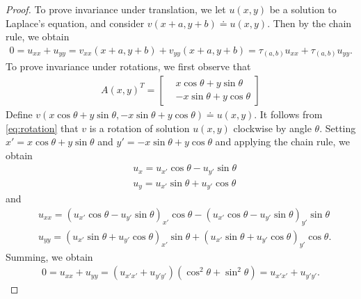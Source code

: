 \begin{proof}
	To prove invariance under translation, we let $u(x,y)$ be a solution to
	Laplace's equation, and consider $v(x+a, y+b) \doteq u(x,y)$. Then by the
	chain rule, we obtain
	\begin{equation*}
	\begin{split}
		0 = u_{xx} + u_{yy} = v_{xx}(x + a, y+b) + v_{yy}(x + a, y+b)
		= \tau_{(a,b)}u_{xx} + \tau_{(a,b)}u_{yy}.
	\end{split}
	\end{equation*}
	To prove invariance under rotations, we first observe that
	\begin{equation}
		\label{eq:rotation}
	\begin{split}
		A(x,y)^{T} = \begin{bmatrix}
		& x \cos \theta + y \sin \theta
		\\
		& -x \sin \theta + y \cos \theta
		\end{bmatrix}
	\end{split}
	\end{equation}
	Define $v(x \cos \theta + y \sin \theta, -x \sin \theta + y \cos \theta)
	\doteq u(x,y)$. It follows from \eqref{eq:rotation} that $v$ is a rotation of
	solution $u(x,y)$ clockwise by angle $\theta$. Setting
	$x' = x \cos \theta + y\sin \theta$ and $y' = -x \sin \theta + y \cos \theta$
	and applying the chain rule, we obtain
	\begin{equation*}
	\begin{split}
		& u_{x} = u_{x'} \cos \theta - u_{y'} \sin \theta
		\\
		& u_{y} = u_{x'} \sin \theta + u_{y'} \cos \theta
	\end{split}
	\end{equation*}
and
\begin{equation*}
\begin{split}
	& u_{xx} = (u_{x'} \cos \theta - u_{y'} \sin \theta)_{x'} \cos \theta -
	(u_{x'} \cos \theta - u_{y'} \sin \theta)_{y'} \sin \theta
	\\
	& u_{yy} = (u_{x'} \sin \theta + u_{y'} \cos \theta)_{x'} \sin \theta
	+ (u_{x'} \sin \theta + u_{y'} \cos \theta)_{y'} \cos \theta.
\end{split}
\end{equation*}
Summing, we obtain
\begin{equation*}
\begin{split}
	0 = u_{xx} + u_{yy} = \left( u_{x'x'} + u_{y'y'} \right)\left( \cos^{2} \theta
		+ \sin^{2} \theta
	\right) = u_{x'x'} + u_{y'y'}.
\end{split}
\end{equation*}
\end{proof}

